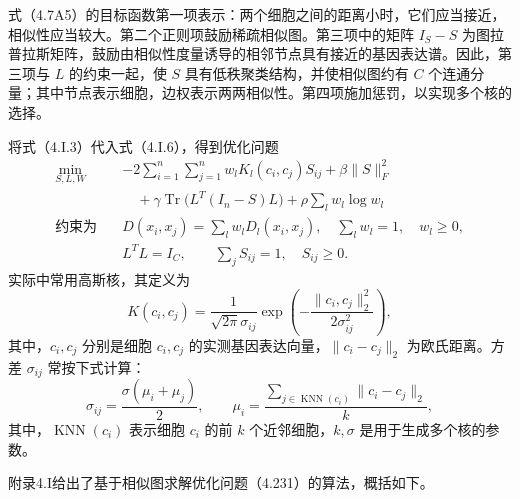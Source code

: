 式（4.7A5）的目标函数第一项表示：两个细胞之间的距离小时，它们应当接近，相似性应当较大。第二个正则项鼓励稀疏相似图。第三项中的矩阵 $I_S-S$ 为图拉普拉斯矩阵，鼓励由相似性度量诱导的相邻节点具有接近的基因表达谱。因此，第三项与 $L$ 的约束一起，使 $S$ 具有低秩聚类结构，并使相似图约有 $C$ 个连通分量；其中节点表示细胞，边权表示两两相似性。第四项施加惩罚，以实现多个核的选择。

将式（4.I.3）代入式（4.I.6），得到优化问题
\begin{equation}
\begin{aligned}
\min_{S,L,W}\quad
 &-2\sum_{i=1}^{n}\sum_{j=1}^{n}w_lK_l(c_i,c_j)S_{ij}
 +\beta\|S\|_F^2\\
 &\quad{}+\gamma\operatorname{Tr}\bigl(L^T(I_n-S)L\bigr)
 +\rho\sum_lw_l\log w_l\\
\text{约束为}\quad
 &D(x_i,x_j)=\sum_lw_lD_l(x_i,x_j),\quad
 \sum_lw_l=1,\quad w_l\ge0,\\
 &L^TL=I_C,\qquad\sum_jS_{ij}=1,\quad S_{ij}\ge0.
\end{aligned}\tag{4.231}
\end{equation}
实际中常用高斯核，其定义为
\begin{equation}
K(c_i,c_j)=\frac{1}{\sqrt{2\pi}\sigma_{ij}}
\exp\left(-\frac{\|c_i,c_j\|_2^2}{2\sigma_{ij}^2}\right),\tag{4.232}
\end{equation}
其中，$c_i,c_j$ 分别是细胞 $c_i,c_j$ 的实测基因表达向量，$\|c_i-c_j\|_2$ 为欧氏距离。方差 $\sigma_{ij}$ 常按下式计算：
\begin{equation}
\sigma_{ij}=\frac{\sigma(\mu_i+\mu_j)}2,
\qquad
\mu_i=\frac{\sum_{j\in\operatorname{KNN}(c_i)}\|c_i-c_j\|_2}{k},\tag{4.233}
\end{equation}
其中，$\operatorname{KNN}(c_i)$ 表示细胞 $c_i$ 的前 $k$ 个近邻细胞，$k,\sigma$ 是用于生成多个核的参数。

附录4.I给出了基于相似图求解优化问题（4.231）的算法，概括如下。

